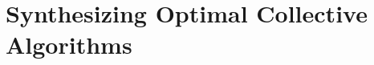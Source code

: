 \chapter{Synthesizing Optimal Collective Algorithms}
\label{chap:sccl}
\newcommand{\CC}{C\nolinebreak\hspace{-.05em}\raisebox{.4ex}{\tiny\bf +}\nolinebreak\hspace{-.10em}\raisebox{.4ex}{\tiny\bf +}}
\def\CC{{C\nolinebreak[4]\hspace{-.05em}\raisebox{.4ex}{\tiny\bf ++}}}

\newcommand{\gathercoll}{Gather\xspace}
\newcommand{\allgather}{Allgather\xspace}
\newcommand{\scatter}{Scatter\xspace}
\newcommand{\reduce}{Reduce\xspace}
\newcommand{\broadcast}{Broadcast\xspace}
\newcommand{\reducescatter}{Reducescatter\xspace}
\newcommand{\allreduce}{Allreduce\xspace}
\newcommand{\alltoall}{Alltoall\xspace}

\newcommand{\dgxone}{DGX-1\xspace}
\newcommand{\dgxtwo}{DGX-2\xspace}
\newcommand{\amd}{AMD\xspace}

\newcommand{\chunkstep}[2]{$#1$-chunk $#2$-step\xspace}


\newcommand{\tool}{SCCL}
\newcommand{\toollong}{Synthesized Collective Communication Library}

\newcommand{\setwhere}{\;|\;} %
\newcommand{\qst}{\;} %
\newcommand{\powerset}{\mathcal{P}}
\newcommand{\posint}{\mathbb{Z}_{\geq0}}
\newcommand{\oftype}{\mathbin{:}}
\newcommand{\range}[1]{\left[#1\right]}
\newcommand{\dotscend}{\dotsc\hspace{-0.08em}}

\newcommand{\Ite}[3]{\mathrm{ITE}(#1,#2,#3)}

\newcommand{\collectiveproblem}{\textsc{SynColl}\xspace}
\newcommand{\bcastproblem}{\textsc{SynCollBcast}\xspace}
\newcommand{\reducingproblem}{\textsc{SynCollReduce}\xspace}
\newcommand{\size}{P}
\newcommand{\ids}{I}
\newcommand{\pre}{\mathit{pre}}
\newcommand{\post}{\mathit{post}}
\newcommand{\chunk}{C}
\newcommand{\gchunk}{G}
\newcommand{\toglobal}{\mathit{ToGlobal}}
\newcommand{\steps}{S}
\newcommand{\rounds}{R}
\newcommand{\fb}{k}
\newcommand{\bw}{B}
\newcommand{\rparts}{Q}
\newcommand{\sends}{T}
\newcommand{\start}[2]{\mathit{time}_{#1,#2}}
\newcommand{\send}[3]{\mathit{snd}_{#1,#2,#3}}
\newcommand{\qouta}{\mathit{Q}}

